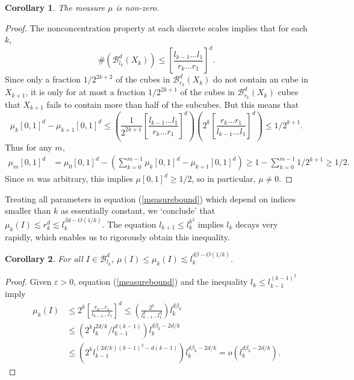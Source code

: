 \documentclass[dvipsnames]{article}
\theoremstyle{plain}
\newtheorem{corollary}{Corollary}
\theoremstyle{plain}
\begin{document}
\begin{corollary}
	The measure $\mu$ is non-zero.
\end{corollary}
\begin{proof}
	The nonconcentration property at each discrete scales implies that for each $k$,
	\[ \# (\mathcal{B}^d_{l_k}(X_k)) \leq \left[ \frac{l_{k-1} \dots l_1}{r_k \dots r_1} \right]^d. \]
	Since only a fraction $1/2^{2k+2}$ of the cubes in $\mathcal{B}^d_{r_k}(X_k)$ do not contain an cube in $X_{k+1}$, it is only for at most a fraction $1/2^{2k+1}$ of the cubes in $\mathcal{B}^d_{r_k}(X_k)$ cubes that $X_{k+1}$ fails to contain more than half of the subcubes. But this means that
	\[ \mu_k[0,1]^d - \mu_{k+1}[0,1]^d \leq \left( \frac{1}{2^{2k + 1}} \left[ \frac{l_{k-1} \dots l_1}{r_k \dots r_1} \right]^d \right) \left( 2^{k} \left[ \frac{r_k \dots r_1}{l_{k-1} \dots l_1} \right]^d \right) \leq 1/2^{k+1}. \]
	Thus for any $m$,
	\begin{align*}
		\mu_m [0,1]^d &= \mu_0 [0,1]^d - \left( \sum_{k = 0}^{m-1} \mu_k [0,1]^d - \mu_{k+1} [0,1]^d \right) \geq 1 - \sum_{k = 0}^{m-1} 1/2^{k+1} \geq 1/2.
	\end{align*}
	Since $m$ was arbitrary, this implies $\mu [0,1]^d \geq 1/2$, so in particular, $\mu \neq 0$.
\end{proof}

Treating all parameters in equation (\ref{measurebound}) which depend on indices smaller than $k$ as essentially constant, we `conclude' that $\mu_k(I) \lesssim r_k^d \lesssim l_k^{\beta d - O(1/k)}$. The equation $l_{k+1} \leq l_k^{k^2}$ implies $l_k$ decays very rapidly, which enables us to rigorously obtain this inequality.

\begin{corollary}
	For all $I \in \mathcal{B}^d_{l_k}$, $\mu(I) \leq \mu_k(I) \lesssim l_k^{d \beta - O(1/k)}$.
\end{corollary}
\begin{proof}
	Given $\varepsilon > 0$, equation (\ref{measurebound}) and the inequality $l_k \leq l_{k-1}^{(k-1)^2}$ imply
	\begin{align*}
		\mu_k(I) &\leq 2^k \left[ \frac{r_k \dots r_1}{l_{k-1} \dots l_1} \right]^d \leq \left( \frac{2^k}{l_{k-1}^d \dots l_1^d} \right) l_k^{d \beta_k}\\
		&\leq \left( 2^k l_k^{2d/k} / l_{k-1}^{d(k-1)} \right) l_k^{d \beta_k - 2d/k}\\
		&\leq \left( 2^k l_{k-1}^{(2d/k) (k-1)^2 - d(k - 1)} \right) l_k^{d \beta_k - 2d/k} = o(l_k^{d\beta_k - 2d/k}). \tag*{\qedhere}
	\end{align*}
\end{proof}
\end{document}
